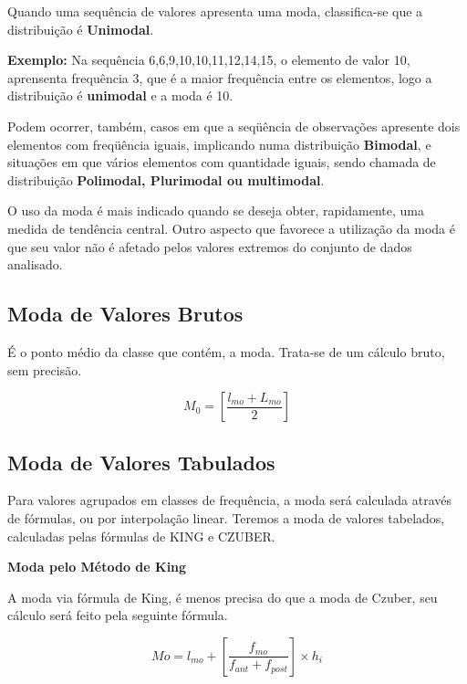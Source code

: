 Quando uma sequência de valores apresenta uma moda, classifica-se que a distribuição é \textbf{Unimodal}.\vskip0.3cm


\textbf{Exemplo:} Na sequência 6,6,9,10,10,11,12,14,15, o elemento de valor 10, aprensenta frequência 3, que é a maior frequência entre os elementos, logo a distribuição é \textbf{unimodal} e a moda é 10.\vskip0.3cm

Podem ocorrer, também, casos em que a seqüência de observações apresente dois elementos com freqüência iguais, implicando numa distribuição \textbf{Bimodal}, e situações em que vários elementos com quantidade iguais, sendo chamada de distribuição \textbf{Polimodal, Plurimodal ou multimodal}.\vskip0.3cm

O uso da moda é mais indicado quando se deseja obter, rapidamente, uma medida de tendência central. Outro aspecto que favorece a utilização da moda é que seu valor não é afetado pelos valores extremos do conjunto de dados analisado.\vskip0.3cm

\subsection{Moda de Valores Brutos}

\vskip0.3cm


É o ponto médio da classe que contém, a moda. Trata-se de um cálculo bruto, sem precisão.

\begin{equation}\label{}
    M_{0}= \left[\frac{l_{mo}+L_{mo}}{2}\right]
\end{equation}


\subsection{Moda de Valores Tabulados}

\vskip0.3cm

Para valores agrupados em classes de frequência, a moda será calculada através de fórmulas, ou por interpolação linear. Teremos a moda de valores tabelados, calculadas pelas fórmulas de KING e CZUBER.
\vskip0.3cm


\textbf{Moda pelo Método de King}
\vskip0.3cm

A moda via fórmula de King, é menos precisa do que a moda de Czuber, seu cálculo será feito pela seguinte fórmula.


\begin{equation}\label{}
    Mo=l_{mo}+\left[\frac{f_{mo}}{f_{ant}+f_{post}}\right]\times h_{i}
\end{equation}


